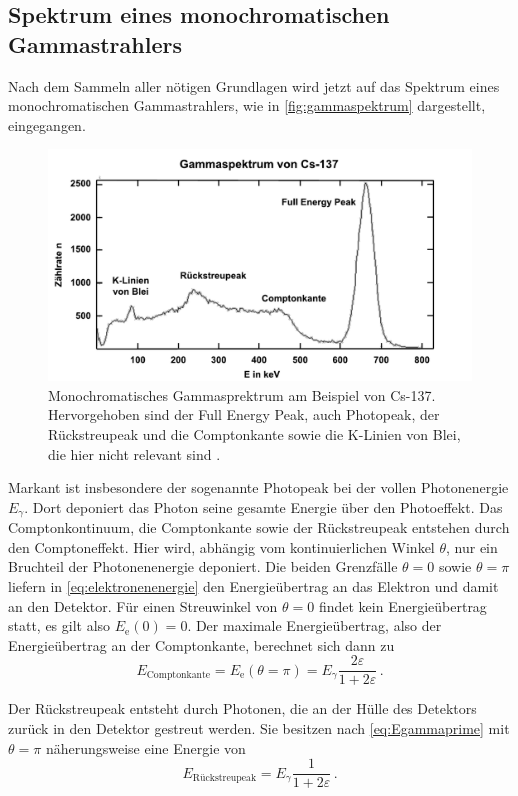 \subsection{Spektrum eines monochromatischen Gammastrahlers}

Nach dem Sammeln aller nötigen Grundlagen wird jetzt auf das Spektrum eines monochromatischen Gammastrahlers, wie in \autoref{fig:gammaspektrum} dargestellt, eingegangen.

\begin{figure}[H]
    \centering
    \includegraphics{figures/Gammaspektrum.pdf}
    \caption{Monochromatisches Gammasprektrum am Beispiel von Cs-137. Hervorgehoben sind der Full Energy Peak, auch Photopeak,
    der Rückstreupeak und die Comptonkante sowie die K-Linien von Blei, die hier nicht relevant sind \cite{gammaspektrum}.}
    \label{fig:gammaspektrum}
\end{figure}

Markant ist insbesondere der sogenannte Photopeak bei der vollen Photonenergie $E_\gamma$.
Dort deponiert das Photon seine gesamte Energie über den Photoeffekt.
Das Comptonkontinuum, die Comptonkante sowie der Rückstreupeak entstehen durch den Comptoneffekt.
Hier wird, abhängig vom kontinuierlichen Winkel $\theta$, nur ein Bruchteil der Photonenenergie deponiert.
Die beiden Grenzfälle $\theta = 0$ sowie $\theta = \pi$ liefern in \eqref{eq:elektronenenergie} den Energieübertrag an das Elektron und damit an den Detektor.
Für einen Streuwinkel von $\theta = 0$ findet kein Energieübertrag statt, es gilt also $E_\text{e}(0) = 0$.
Der maximale Energieübertrag, also der Energieübertrag an der Comptonkante, berechnet sich dann zu
\begin{equation}
    E_\text{Comptonkante} = E_\text{e} (\theta = \pi) = E_\gamma \frac{2 \varepsilon}{1 + 2 \varepsilon} \,.
    \label{eq:Comptonpeak}
\end{equation}

Der Rückstreupeak entsteht durch Photonen, die an der Hülle des Detektors zurück in den Detektor gestreut werden.
Sie besitzen nach \eqref{eq:Egammaprime} mit $\theta = \pi$ näherungsweise eine Energie von
\begin{equation}
    E_\text{Rückstreupeak} = E_\gamma \frac{1}{1 + 2 \varepsilon} \,.
    \label{eq:Rückstreupeak}
\end{equation}







